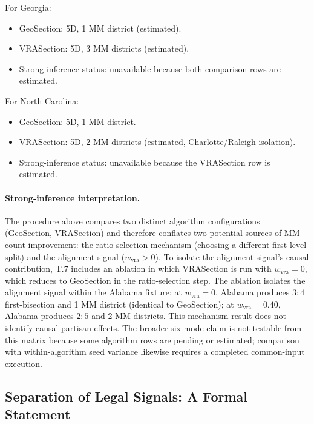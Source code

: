 For Georgia:
\begin{itemize}
  \item GeoSection: 5D, 1 MM district (estimated).
  \item VRASection: 5D, 3 MM districts (estimated).
  \item Strong-inference status: unavailable because both comparison rows are
    estimated.
\end{itemize}

For North Carolina:
\begin{itemize}
  \item GeoSection: 5D, 1 MM district.
  \item VRASection: 5D, 2 MM districts (estimated, Charlotte/Raleigh isolation).
  \item Strong-inference status: unavailable because the VRASection row is
    estimated.
\end{itemize}

\paragraph{Strong-inference interpretation.}
The procedure above compares two distinct algorithm configurations (GeoSection,
VRASection) and therefore conflates two potential sources of MM-count improvement:
the ratio-selection mechanism (choosing a different first-level split) and the
alignment signal ($w_\text{vra} > 0$).
To isolate the alignment signal's causal contribution, T.7 includes an ablation
in which VRASection is run with $w_\text{vra} = 0$, which reduces to GeoSection
in the ratio-selection step.
The ablation isolates the alignment signal within the Alabama fixture: at
$w_\text{vra} = 0$, Alabama produces $3:4$ first-bisection and
1 MM district (identical to GeoSection); at $w_\text{vra} = 0.40$, Alabama
produces $2:5$ and 2 MM districts.
This mechanism result does not identify causal partisan effects. The broader
six-mode claim is not testable from this matrix because some algorithm rows are
pending or estimated; comparison with within-algorithm seed variance likewise
requires a completed common-input execution.

\subsection{Separation of Legal Signals: A Formal Statement}

